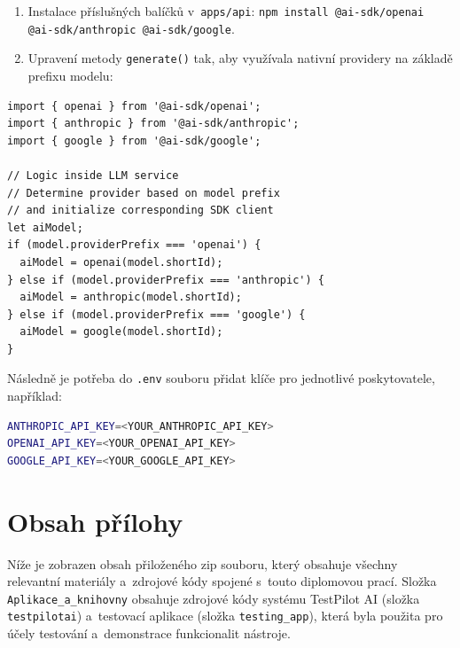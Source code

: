 \documentclass[czech, ing, kiv, he, iso690numb, viewonly]{fasthesis}
\begin{document}
\begin{enumerate}
    \item Instalace příslušných balíčků v~\texttt{apps/api}: \texttt{npm install @ai-sdk/openai @ai-sdk/anthropic @ai-sdk/google}.
    \item Upravení metody \texttt{generate()} tak, aby využívala nativní providery na základě prefixu modelu:
\end{enumerate}


\begin{lstlisting}[style=tscode, basicstyle=\ttfamily\scriptsize, float=false]
import { openai } from '@ai-sdk/openai';
import { anthropic } from '@ai-sdk/anthropic';
import { google } from '@ai-sdk/google';

// Logic inside LLM service
// Determine provider based on model prefix 
// and initialize corresponding SDK client
let aiModel;
if (model.providerPrefix === 'openai') {
  aiModel = openai(model.shortId);
} else if (model.providerPrefix === 'anthropic') {
  aiModel = anthropic(model.shortId);
} else if (model.providerPrefix === 'google') {
  aiModel = google(model.shortId);
}
\end{lstlisting}

Následně je potřeba do \texttt{.env} souboru přidat klíče pro jednotlivé poskytovatele, například:
\begin{lstlisting}[language=bash, basicstyle=\ttfamily\small]
ANTHROPIC_API_KEY=<YOUR_ANTHROPIC_API_KEY>
OPENAI_API_KEY=<YOUR_OPENAI_API_KEY> 
GOOGLE_API_KEY=<YOUR_GOOGLE_API_KEY>
\end{lstlisting}

\chapter{Obsah přílohy}\label{app:structure}

Níže je zobrazen obsah přiloženého zip souboru,
který obsahuje všechny relevantní materiály a~zdrojové kódy 
spojené s~touto diplomovou prací.
\vspace{1em}
\vspace{1em}
\noindent Složka \texttt{Aplikace\_a\_knihovny} obsahuje zdrojové kódy systému TestPilot AI 
(složka \texttt{testpilotai}) a~testovací aplikace (složka \texttt{testing\_app}), 
která byla použita pro účely testování a~demonstrace funkcionalit nástroje.
\newline
\end{document}
